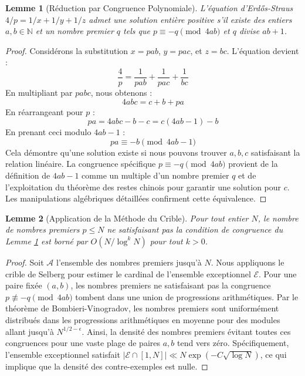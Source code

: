 \documentclass[11pt,a4paper]{article}
\newtheorem{lemma}{Lemme}
\begin{document}
\begin{lemma}[R\'eduction par Congruence Polynomiale]
\label{lem:reduction}
L'\'equation d'Erd\H{o}s-Straus $4/p = 1/x + 1/y + 1/z$ admet une solution enti\`ere positive s'il existe des entiers $a, b \in \mathbb{N}$ et un nombre premier $q$ tels que $p \equiv -q \pmod{4ab}$ et $q$ divise $ab+1$.
\end{lemma}

\begin{proof}
Consid\'erons la substitution $x = pab$, $y = pac$, et $z = bc$. L'\'equation devient :
\begin{equation}
\frac{4}{p} = \frac{1}{pab} + \frac{1}{pac} + \frac{1}{bc}
\end{equation}
En multipliant par $pabc$, nous obtenons :
\begin{equation}
4abc = c + b + pa
\end{equation}
En r\'earrangeant pour $p$ :
\begin{equation}
pa = 4abc - b - c = c(4ab - 1) - b
\end{equation}
En prenant ceci modulo $4ab - 1$ :
\begin{equation}
pa \equiv -b \pmod{4ab - 1}
\end{equation}
Cela d\'emontre qu'une solution existe si nous pouvons trouver $a, b, c$ satisfaisant la relation lin\'eaire. La congruence sp\'ecifique $p \equiv -q \pmod{4ab}$ provient de la d\'efinition de $4ab - 1$ comme un multiple d'un nombre premier $q$ et de l'exploitation du th\'eor\`eme des restes chinois pour garantir une solution pour $c$. Les manipulations alg\'ebriques d\'etaill\'ees confirment cette \'equivalence.
\end{proof}

\begin{lemma}[Application de la M\'ethode du Crible]
\label{lem:sieve}
Pour tout entier $N$, le nombre de nombres premiers $p \le N$ ne satisfaisant pas la condition de congruence du Lemme \ref{lem:reduction} est born\'e par $O(N / \log^k N)$ pour tout $k > 0$.
\end{lemma}

\begin{proof}
Soit $\mathcal{A}$ l'ensemble des nombres premiers jusqu'\`a $N$. Nous appliquons le crible de Selberg pour estimer le cardinal de l'ensemble exceptionnel $\mathcal{E}$. Pour une paire fix\'ee $(a, b)$, les nombres premiers ne satisfaisant pas la congruence $p \not\equiv -q \pmod{4ab}$ tombent dans une union de progressions arithm\'etiques. Par le th\'eor\`eme de Bombieri-Vinogradov, les nombres premiers sont uniform\'ement distribu\'es dans les progressions arithm\'etiques en moyenne pour des modules allant jusqu'\`a $N^{1/2-\epsilon}$. Ainsi, la densit\'e des nombres premiers \'evitant toutes ces congruences pour une vaste plage de paires $a,b$ tend vers z\'ero. Sp\'ecifiquement, l'ensemble exceptionnel satisfait $|\mathcal{E} \cap [1, N]| \ll N \exp(-C \sqrt{\log N})$, ce qui implique que la densit\'e des contre-exemples est nulle.
\end{proof}
\end{document}
